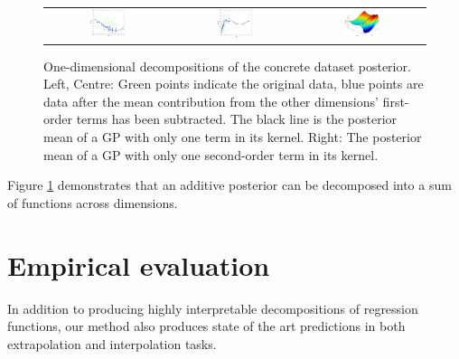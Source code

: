 \documentclass[twoside]{article}
\begin{document}
\begin{figure}[h]
\centering
\begin{tabular}{ccc}
\includegraphics[width=0.3\textwidth]{../figures/additive_multi_d/interpretable_1st_order1.pdf} &
\includegraphics[width=0.3\textwidth]{../figures/additive_multi_d/interpretable_1st_order2.pdf}& 
\includegraphics[width=0.3\textwidth]{../figures/additive_multi_d/interpretable_2nd_order1.pdf}\\
\end{tabular}
\caption{One-dimensional decompositions of the concrete dataset posterior.  Left, Centre:  Green points indicate the original data, blue points are data after the mean contribution from the other dimensions' first-order terms has been subtracted.  The black line is the posterior mean of a GP with only one term in its kernel.  Right:  The posterior mean of a GP with only one second-order term in its kernel.}
\label{fig:interpretable functions}
\end{figure}
%
Figure \ref{fig:interpretable functions} demonstrates that an additive posterior can be decomposed into a sum of functions across dimensions.


\section{Empirical evaluation}

In addition to producing highly interpretable decompositions of regression functions, our method also produces state of the art predictions in both extrapolation and interpolation tasks.
\end{document}
